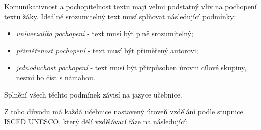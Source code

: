 \documentclass[12pt]{article}
\begin{document}
Komunikativnost a pochopitelnost textu mají velmi podstatný vliv na pochopení textu žáky. Ideálně srozumitelný text musí splňovat následující podmínky:

\begin{itemize}
	\item{} \textit{univerzalita pochopení} - text musí být plně srozumitelný;
	\item{} \textit{přiměřenost pochopení} - text musí být přiměřený autorovi;
	\item{} \textit{jednoduchost pochopení} - text musí být přizpůsoben úrovni cílové skupiny, nesmí ho číst s námahou.
\end{itemize}

Splnění všech těchto podmínek závisí na jazyce učebnice.

\cite[s. 35-40]{PAN2023}

Z toho důvodu má každá učebnice nastavený úroveň vzdělání podle stupnice ISCED UNESCO, který dělí vzdělávací fáze na následující:
\end{document}
